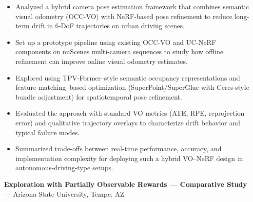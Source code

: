 \documentclass[11pt]{article}
\begin{document}
\begin{itemize}[leftmargin=*,noitemsep]
  
  \item Analyzed a hybrid camera pose estimation framework that combines semantic visual odometry (OCC-VO) with NeRF-based pose refinement to reduce long-term drift in 6-DoF trajectories on urban driving scenes.
  
  \item Set up a prototype pipeline using existing OCC-VO and UC-NeRF components on nuScenes multi-camera sequences to study how offline refinement can improve online visual odometry estimates.
  
  \item Explored using TPV-Former–style semantic occupancy representations and feature-matching–based optimization (SuperPoint/SuperGlue with Ceres-style bundle adjustment) for spatiotemporal pose refinement.
  
  \item Evaluated the approach with standard VO metrics (ATE, RPE, reprojection error) and qualitative trajectory overlays to characterize drift behavior and typical failure modes.
  
  \item Summarized trade-offs between real-time performance, accuracy, and implementation complexity for deploying such a hybrid VO–NeRF design in autonomous-driving-type setups.
  
\end{itemize}


\vspace{2pt}

\textbf{ Exploration with Partially Observable Rewards — Comparative Study } --- Arizona State University, Tempe, AZ\\
\end{document}
